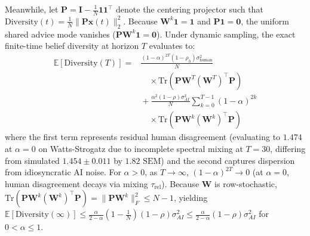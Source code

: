 \documentclass
[letterpaper]{article}
\begin{document}
Meanwhile, let $\mathbf{P} = \mathbf{I} - \frac{1}{N}\mathbf{1}\mathbf{1}^\top$ denote the centering projector such that $\text{Diversity}(t) = \frac{1}{N}\|\mathbf{P}\mathbf{x}(t)\|_2^2$. Because $\mathbf{W}^k\mathbf{1} = \mathbf{1}$ and $\mathbf{P}\mathbf{1} = \mathbf{0}$, the uniform shared advice mode vanishes ($\mathbf{P}\mathbf{W}^k\mathbf{1} = \mathbf{0}$). Under dynamic sampling, the exact finite-time belief diversity at horizon $T$ evaluates to:
\begin{align}
\mathbb{E}[\text{Diversity}(T)] ={}& \frac{(1-\alpha)^{2T}(1-\rho_h)\sigma_{\text{human}}^2}{N} \nonumber \\
&\quad\times \text{Tr}\!\left( \mathbf{P}\mathbf{W}^T(\mathbf{W}^T)^\top \mathbf{P} \right) \nonumber \\
&{}+ \frac{\alpha^2 (1 - \rho)\sigma_{AI}^2}{N} \sum_{k=0}^{T-1} (1-\alpha)^{2k} \nonumber \\
&\quad\times \text{Tr}\!\left( \mathbf{P}\mathbf{W}^k (\mathbf{W}^k)^\top \mathbf{P} \right)
\label{eq:finite_diversity}
\end{align}
where the first term represents residual human disagreement (evaluating to $1.474$ at $\alpha=0$ on Watts-Strogatz due to incomplete spectral mixing at $T=30$, differing from simulated $1.454 \pm 0.011$ by $1.82\text{ SEM}$) and the second captures dispersion from idiosyncratic AI noise. For $\alpha > 0$, as $T \to \infty$, $(1-\alpha)^{2T} \to 0$ (at $\alpha=0$, human disagreement decays via mixing $\tau_{\text{rel}}$). Because $\mathbf{W}$ is row-stochastic, $\text{Tr}(\mathbf{P}\mathbf{W}^k(\mathbf{W}^k)^\top\mathbf{P}) = \|\mathbf{P}\mathbf{W}^k\|_F^2 \le N - 1$, yielding $\mathbb{E}[\text{Diversity}(\infty)] \le \frac{\alpha}{2-\alpha}(1 - \frac{1}{N})(1-\rho)\sigma_{AI}^2 \le \frac{\alpha}{2-\alpha}(1-\rho)\sigma_{AI}^2$ for $0 < \alpha \le 1$.
\end{document}
